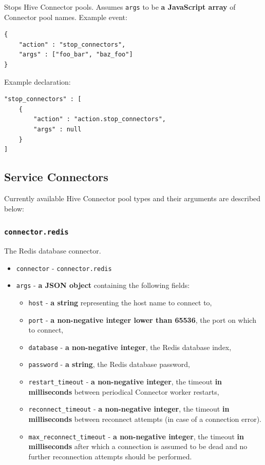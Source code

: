 \documentclass[a4paper]{article}
\begin{document}
Stops Hive Connector pools. Assumes \texttt{args} to be \textbf{a JavaScript array} of Connector pool names. Example event:


\begin{verbatim}
{
    "action" : "stop_connectors",
    "args" : ["foo_bar", "baz_foo"]
}
\end{verbatim}




\noindent
Example declaration:

\begin{verbatim}
"stop_connectors" : [
    {
        "action" : "action.stop_connectors",
        "args" : null
    }
]
\end{verbatim}
\subsection{Service Connectors}
\label{sec-9-4}
\label{ref-connectors}

Currently available Hive Connector pool types and their arguments are described below:
\subsubsection{\texttt{connector.redis}}
\label{sec-9-4-1}

The Redis database connector.


\begin{itemize}
\item \texttt{connector} - \texttt{connector.redis}
\item \texttt{args} - \textbf{a JSON object} containing the following fields:
\begin{itemize}
\item \texttt{host} - \textbf{a string} representing the host name to connect to,
\item \texttt{port} - \textbf{a non-negative integer lower than 65536}, the port on which to connect,
\item \texttt{database} - \textbf{a non-negative integer}, the Redis database index,
\item \texttt{password} - \textbf{a string}, the Redis database password,
\item \texttt{restart\_timeout} - \textbf{a non-negative integer}, the timeout \textbf{in milliseconds} between periodical Connector worker restarts,
\item \texttt{reconnect\_timeout} - \textbf{a non-negative integer}, the timeout \textbf{in milliseconds} between reconnect attempts (in case of a connection error).
\item \texttt{max\_reconnect\_timeout} - \textbf{a non-negative integer}, the timeout \textbf{in milliseconds} after which a connection is assumed to be dead and no further reconnection attempts should be performed.
\end{itemize}
\end{itemize}
\end{document}
